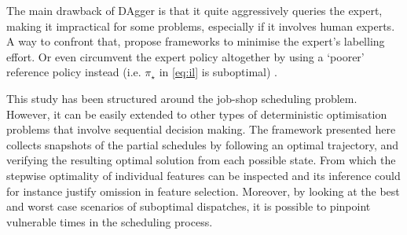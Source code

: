 \documentclass[twocolumn]{svjour3}
\begin{document}

The main drawback of DAgger is that it quite aggressively queries the expert, 
making it impractical for some problems, especially if it involves human 
experts. A way to confront that, \cite{Kim13,Judah12} propose frameworks to 
minimise the expert's labelling effort.
Or even circumvent the expert policy altogether by using a `poorer' reference 
policy instead (i.e. $\pi_\star$ in \cref{eq:il} is suboptimal) 
\cite{ChangKADL15}.

This study has been structured around the job-shop scheduling problem. However, 
it can be easily extended to other types of deterministic optimisation problems 
that involve sequential decision making. 
The framework presented here collects snapshots of the partial schedules by 
following an optimal trajectory, and verifying the resulting optimal solution 
from each possible state. 
From which the stepwise optimality of individual features can be inspected 
and its inference could for instance justify omission in feature selection. 
Moreover, by looking at the best and worst case scenarios of suboptimal 
dispatches, it is possible to pinpoint vulnerable times in the scheduling 
process. 
\end{document}
